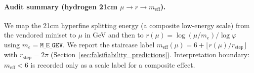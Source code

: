 \paragraph{Audit summary (hydrogen 21cm $\mu\to r\to m_{\mathrm{eff}}$).} \AuditTag We map the 21cm hyperfine splitting energy (a composite low-energy scale) from the vendored miniset to $\mu$ in GeV and then to $r(\mu)=\log(\mu/m_e)/\log\varphi$ using $m_e=\texttt{M\_E\_GEV}$. We report the staircase label $m_{\mathrm{eff}}(\mu)=6+\lfloor r(\mu)/r_{\mathrm{step}}\rfloor$ with $r_{\mathrm{step}}=2\pi$ (Section~\ref{sec:falsifiability_predictions}). Interpretation boundary: $m_{\mathrm{eff}}<6$ is recorded only as a scale label for a composite effect.